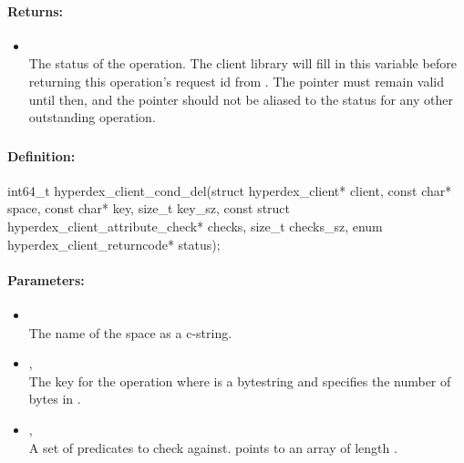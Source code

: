 \paragraph{Returns:}
\begin{itemize}[noitemsep]
\item {}\\
The status of the operation.  The client library will fill in this variable before returning this operation's request id from .  The pointer must remain valid until then, and the pointer should not be aliased to the status for any other outstanding operation.
\end{itemize}

\pagebreak
\subsubsection{}
\label{api:c:cond_del}


\paragraph{Definition:}
\begin{ccode}
int64_t hyperdex_client_cond_del(struct hyperdex_client* client,
        const char* space,
        const char* key, size_t key_sz,
        const struct hyperdex_client_attribute_check* checks, size_t checks_sz,
        enum hyperdex_client_returncode* status);
\end{ccode}

\paragraph{Parameters:}
\begin{itemize}[noitemsep]
\item {}\\
The name of the space as a c-string.
\item {}, \\
The key for the operation where  is a bytestring and  specifies the number of bytes in .
\item {}, \\
A set of predicates to check against.   points to an array of length .
\end{itemize}

